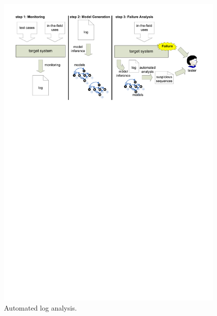 \begin{figure}[ht!]
    \begin{center}
        \includegraphics[width=12cm]{images/approach}
    \end{center}
    \caption{Automated log analysis.} \label{fig:approach}
\end{figure}

